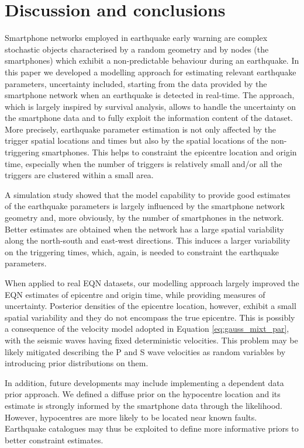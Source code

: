 \documentclass[final]{statsoc}
\begin{document}
\section{Discussion and conclusions}\label{sec:discussion}

Smartphone networks employed in earthquake early warning are complex stochastic objects characterised by a random geometry and by nodes (the smartphones) which exhibit a non-predictable behaviour during an earthquake. In this paper we developed a modelling approach for estimating relevant earthquake parameters, uncertainty included, starting from the data provided by the smartphone network when an earthquake is detected in real-time. The approach, which is largely inspired by survival analysis, allows to handle the uncertainty on the smartphone data and to fully exploit the information content of the dataset. More precisely, earthquake parameter estimation is not only affected by the trigger spatial locations and times but also by the spatial locations of the non-triggering smartphones. This helps to constraint the epicentre location and origin time, especially when the number of triggers is relatively small and/or all the triggers are clustered within a small area.

A simulation study showed that the model capability to provide good estimates of the earthquake parameters is largely influenced by the smartphone network geometry and, more obviously, by the number of smartphones in the network. Better estimates are obtained when the network has a large spatial variability along the north-south and east-west directions. This induces a larger variability on the triggering times, which, again, is needed to constraint the earthquake parameters.

When applied to real EQN datasets, our modelling approach largely improved the EQN estimates of epicentre and origin time, while providing measures of uncertainty. Posterior densities of the epicentre location, however, exhibit a small spatial variability and they do not encompass the true epicentre. This is possibly a consequence of the velocity model adopted in Equation \eqref{eq:gauss_mixt_par}, with the seismic waves having fixed deterministic velocities. This problem may be likely mitigated describing the P and S wave velocities as random variables by introducing prior distributions on them.

In addition, future developments may include implementing a dependent data prior approach. We defined a diffuse prior on the hypocentre location and its estimate is strongly informed by the smartphone data through the likelihood. However, hypocentres are more likely to be located near known faults. Earthquake catalogues may thus be exploited to define more informative priors to better constraint estimates.
\end{document}
